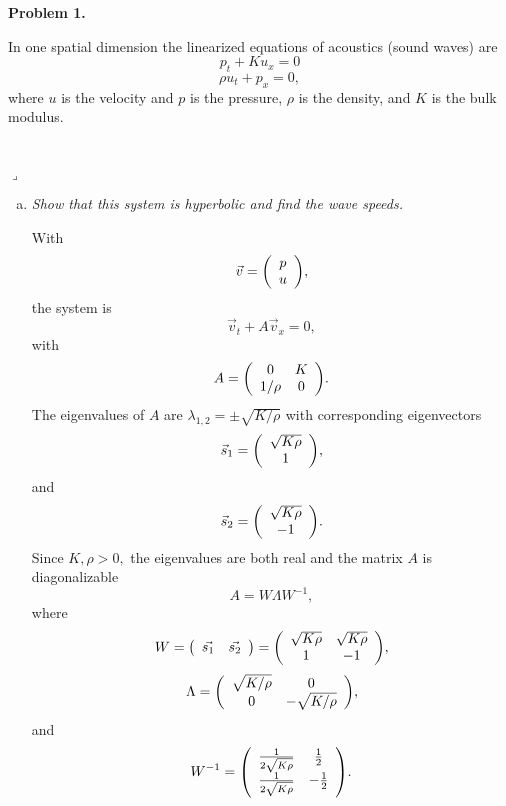 \documentclass[12pt]{article}
\newenvironment{myprob}[1]
    {%
    \noindent{\Huge$\ulcorner$}\textbf{#1.}\begin{em}
    }
    { 
    \end{em} \\ \hphantom{l} \hfill {\Huge$\lrcorner$} }
\begin{document}
\rhead{\today}

{\let\newpage\relax} 


\begin{myprob}{Problem 1}
In one spatial dimension the linearized equations of acoustics (sound waves) are
$$p_t + K u_x = 0 $$
$$\rho u_t + p_x =0,$$
where $u$ is the velocity and $p$ is the pressure, $\rho$ is the density, and $K$ is the bulk modulus.
\end{myprob}
\begin{enumerate}[(a)]
\item \emph{Show that this system is hyperbolic and find the wave speeds.}

With $$\vec{v} = \qty(\begin{array}{c} p \\ u \end{array}),$$
the system is $$\vec{v}_t + A\vec{v}_x = 0,$$
with $$A = \qty(\begin{array}{cc} 0 & K \\ 1/\rho & 0 \end{array}).$$
The eigenvalues of $A$ are $\lambda_{1,2}=\pm \sqrt{K/\rho}$ with corresponding eigenvectors $$\vec{s}_1 = \qty(\begin{array}{c} \sqrt{K\rho} \\ 1 \end{array}),$$
and $$\vec{s}_2 = \qty(\begin{array}{c} \sqrt{K\rho} \\ -1 \end{array}).$$
Since $K, \rho >0,$ the eigenvalues are both real and the matrix $A$ is diagonalizable
$$ A = W\Lambda W^{-1},$$
where $$W = \qty(\begin{array}{cc} \vec{s_1} & \vec{s_2} \end{array}) = \qty(\begin{array}{cc} \sqrt{K\rho} & \sqrt{K\rho} \\ 1 & -1 \end{array}),$$
$$ \Lambda = \qty(\begin{array}{cc} \sqrt{K/\rho} & 0 \\ 0 & -\sqrt{K/\rho} \end{array}),$$
and $$ W^{-1} = \qty(\begin{array}{cc} \frac{1}{2\sqrt{K\rho}} & \frac{1}{2} \\ \frac{1}{2\sqrt{K\rho}} & -\frac{1}{2} \end{array}).$$

\end{enumerate}
\end{document}
